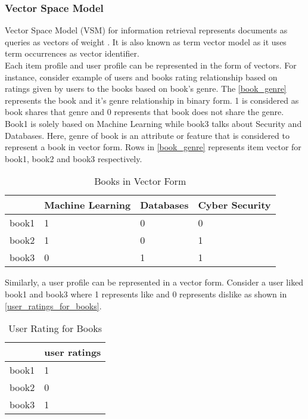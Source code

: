 \subsubsection{Vector Space Model}
\label{vector_space_model}
Vector Space Model (VSM) for information retrieval represents documents as queries as vectors of weight \cite{46}. It is also known as term vector model as it uses term occurrences as vector identifier. 
\\
Each item profile and user profile can be represented in the form of vectors. For instance, consider example of users and books rating relationship based on ratings given by users to the books based on book's genre. The \autoref{book_genre} represents the book and it's genre relationship in binary form. 1 is considered as book shares that genre and 0 represents that book does not share the genre. Book1 is solely based on Machine Learning while book3 talks about Security and Databases. Here, genre of book is an attribute or feature that is considered to represent a book in vector form. Rows in \autoref{book_genre} represents item vector for book1, book2 and book3 respectively.   

\begin{table}[]
\centering

\begin{tabular}{|l|l|l|l|}
\hline
      & Machine Learning & Databases & Cyber Security \\ \hline
book1 & 1                & 0         & 0              \\ \hline
book2 & 1                & 0         & 1              \\ \hline
book3 & 0                & 1         & 1              \\ \hline
\end{tabular}
\caption{Books in Vector Form}

\label{book_genre}
\end{table} 

\noindent
Similarly, a user profile can be represented in a vector form. Consider a user liked book1 and book3 where 1 represents like and 0 represents dislike as shown in \autoref{user_ratings_for_books}. 

\begin{table}[]
\centering
\begin{tabular}{|l|l|}
\hline
      & user ratings \\ \hline
book1 & 1            \\ \hline
book2 & 0            \\ \hline
book3 & 1            \\ \hline
\end{tabular}
\caption{User Rating for Books}
\label{user_ratings_for_books}
\end{table}


